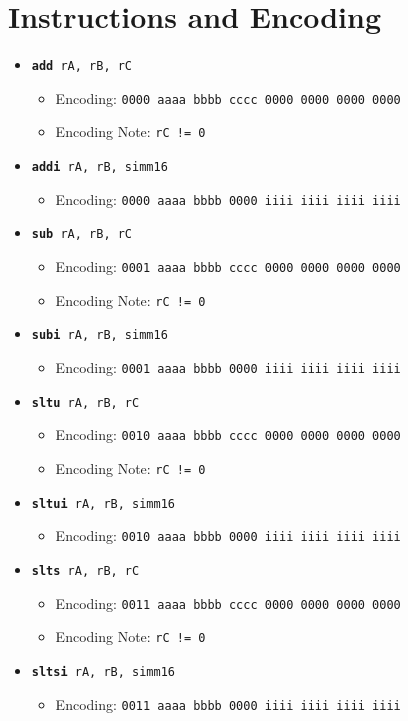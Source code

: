 \documentclass{article}
\begin{document}
	\section{Instructions and Encoding}
	\begin{itemize}
		\item \texttt{\textbf{add} rA, rB, rC}
		\begin{itemize}
			\item Encoding: 
				\texttt{0000 aaaa bbbb cccc  0000 0000 0000 0000}
			\item Encoding Note:  \texttt{rC != 0}
		\end{itemize}
		\item \texttt{\textbf{addi} rA, rB, simm16}
		\begin{itemize}
			\item Encoding: 
				\texttt{0000 aaaa bbbb 0000  iiii iiii iiii iiii}
		\end{itemize}

		\item \texttt{\textbf{sub} rA, rB, rC}
		\begin{itemize}
			\item Encoding: 
				\texttt{0001 aaaa bbbb cccc  0000 0000 0000 0000}
			\item Encoding Note:  \texttt{rC != 0}
		\end{itemize}
		\item \texttt{\textbf{subi} rA, rB, simm16}
		\begin{itemize}
			\item Encoding: 
				\texttt{0001 aaaa bbbb 0000  iiii iiii iiii iiii}
		\end{itemize}

		\item \texttt{\textbf{sltu} rA, rB, rC}
		\begin{itemize}
			\item Encoding: 
				\texttt{0010 aaaa bbbb cccc  0000 0000 0000 0000}
			\item Encoding Note:  \texttt{rC != 0}
		\end{itemize}
		\item \texttt{\textbf{sltui} rA, rB, simm16}
		\begin{itemize}
			\item Encoding: 
				\texttt{0010 aaaa bbbb 0000  iiii iiii iiii iiii}
		\end{itemize}

		\item \texttt{\textbf{slts} rA, rB, rC}
		\begin{itemize}
			\item Encoding: 
				\texttt{0011 aaaa bbbb cccc  0000 0000 0000 0000}
			\item Encoding Note:  \texttt{rC != 0}
		\end{itemize}
		\item \texttt{\textbf{sltsi} rA, rB, simm16}
		\begin{itemize}
			\item Encoding: 
				\texttt{0011 aaaa bbbb 0000  iiii iiii iiii iiii}
		\end{itemize}


\end{itemize}
\end{document}

